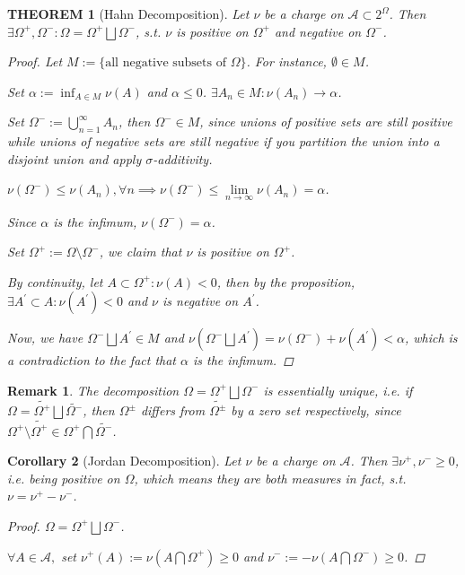 \documentclass[12pt]{article}
\theoremstyle{blueplain}
\newtheorem{theorem}{THEOREM}[section]
\newtheorem{corollary}[theorem]{Corollary}
\theoremstyle{bluedef}
\theoremstyle{blueremark}
\newtheorem{remark}{Remark}[section]
\numberwithin{equation}{section}
\begin{document}
\begin{theorem}[Hahn Decomposition]
  Let $\nu$ be a charge on $\mathcal{A} \subset 2^\Omega$. Then $\exists \Omega^+, \Omega^-: \Omega = \Omega^+ \bigsqcup \Omega^-$, s.t. $\nu$ is positive on $\Omega^+$ and negative on $\Omega^-$.
  \begin{proof}
    Let $M := \{\text{all negative subsets of }\Omega\}$. For instance, $\emptyset \in M$.

    Set $\alpha := \inf_{A \in M} \nu(A)$ and $\alpha \leq 0$. $\exists A_n \in M: \nu(A_n) \rightarrow \alpha$.

    Set $\Omega^- := \bigcup_{n=1}^\infty A_n$, then $\Omega^- \in M$, since unions of positive sets are still positive while unions of negative sets are still negative if you partition the union into a disjoint union and apply $\sigma$-additivity.

    $\nu(\Omega^-)\leq \nu(A_n), \forall n \implies \nu(\Omega^-) \leq \lim\limits_{n \to \infty} \nu(A_n) = \alpha$.

    Since $\alpha$ is the infimum, $\nu(\Omega^-) = \alpha$.

    Set $\Omega^+ := \Omega \setminus \Omega^-$, we claim that $\nu$ is positive on $\Omega^+$.

    By continuity, let $A \subset \Omega^+: \nu(A) < 0$, then by the proposition, $\exists A^\prime \subset A: \nu(A^\prime) < 0$ and $\nu$ is negative on $A^\prime$.

    Now, we have $\Omega^- \bigsqcup A^\prime \in M$ and $\nu(\Omega^- \bigsqcup A^\prime) = \nu(\Omega^-) + \nu(A^\prime) < \alpha$, which is a contradiction to the fact that $\alpha$ is the infimum.
  \end{proof}
\end{theorem}

\begin{remark}
  The decomposition $\Omega = \Omega^+ \bigsqcup \Omega^-$ is essentially unique, i.e. if $\Omega = \widetilde{\Omega^+} \bigsqcup \widetilde{\Omega^-}$, then $\Omega^\pm$ differs from $\widetilde{\Omega^\pm}$ by a zero set respectively, since $\Omega^+ \setminus \widetilde{\Omega^+} \in \Omega^+ \bigcap \widetilde{\Omega^-}$.
\end{remark}

\begin{corollary}[Jordan Decomposition]
  Let $\nu$ be a charge on $\mathcal{A}$. Then $\exists \nu^+, \nu^- \geq 0$, i.e. being positive on $\Omega$, which means they are both measures in fact, s.t. $\nu = \nu^+ - \nu^-$.
  \begin{proof}
    $\Omega = \Omega^+ \bigsqcup \Omega^-$.

    $\forall A \in \mathcal{A},$ set $\nu^+(A) := \nu(A\bigcap \Omega^+) \geq 0$ and $\nu^- := - \nu(A\bigcap \Omega^-) \geq 0$.
  \end{proof}
\end{corollary}
\end{document}
